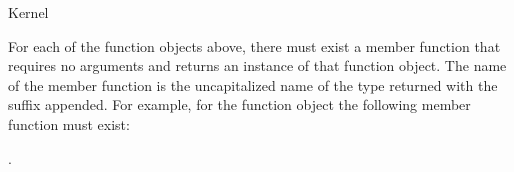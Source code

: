 \begin{ccRefConcept}{Kernel}





\ccOperations

For each of the function objects above, there must exist a member function
that requires no arguments and returns an instance of that function object.
The name of the member function is the uncapitalized name of the type
returned with the suffix  appended.  For example, for the 
function object
 the following member function must exist:


\setlength{\parskip}{0pt}

{}

\def\ccTagRmEigenClassName{\ccTrue}

\ccSeeAlso

.

\end{ccRefConcept} 
